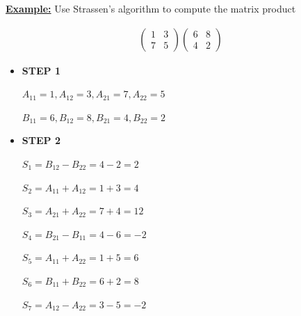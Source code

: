 \documentclass[12pt]{article}
\begin{document}
\begin{enumerate}[1.]
\begin{itemize}
\begin{itemize}
            \bigskip

            \underline{\textbf{Example:}} Use Strassen's algorithm to compute the matrix product

            \begin{align*}
            \begin{pmatrix}
                1 & 3\\
                7 & 5
            \end{pmatrix}
            \begin{pmatrix}
                6 & 8\\
                4 & 2
            \end{pmatrix}
            \end{align*}

            \begin{itemize}
                \item \textbf{STEP 1}

                \bigskip

                $A_{11} = 1, A_{12} = 3, A_{21} = 7, A_{22} = 5$

                \bigskip

                $B_{11} = 6, B_{12} = 8, B_{21} = 4, B_{22} = 2$

                \bigskip
                \item \textbf{STEP 2}

                \bigskip

                $S_1 = B_{12} - B_{22} = 4 - 2 = 2$

                \bigskip

                $S_2 = A_{11} + A_{12} = 1 + 3 = 4$

                \bigskip

                $S_3 = A_{21} + A_{22} = 7 + 4 = 12$

                \bigskip

                $S_4 = B_{21} - B_{11} = 4 - 6 = -2$

                \bigskip

                $S_5 = A_{11} + A_{22} = 1 + 5 = 6$

                \bigskip

                $S_6 = B_{11} + B_{22} = 6 + 2 = 8$

                \bigskip

                $S_7 = A_{12} - A_{22} = 3 - 5 = -2$


\end{itemize}
\end{itemize}
\end{itemize}
\end{enumerate}
\end{document}
